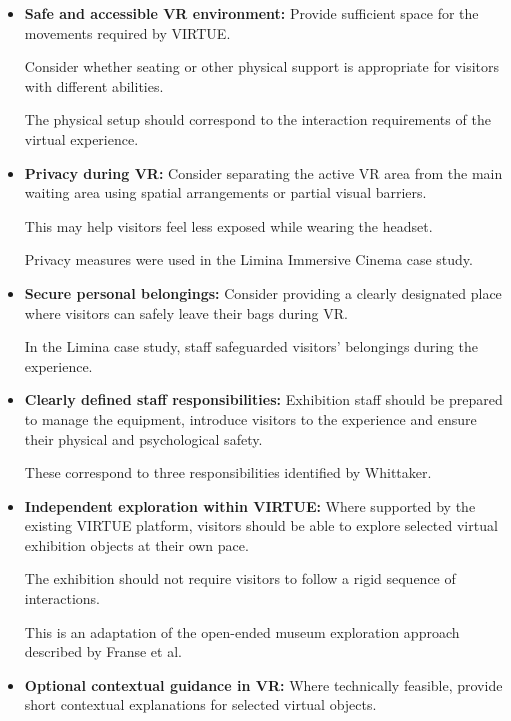 \begin{itemize}
    \item \textbf{Safe and accessible VR environment:}
    Provide sufficient space for the movements required
    by VIRTUE.

    Consider whether seating or other physical support
    is appropriate for visitors with different abilities.

    The physical setup should correspond to the
    interaction requirements of the virtual experience.
    \cite[pp.~100--101]{whittaker_onboarding_2025}

    \item \textbf{Privacy during VR:}
    Consider separating the active VR area from the
    main waiting area using spatial arrangements or
    partial visual barriers.

    This may help visitors feel less exposed while
    wearing the headset.

    Privacy measures were used in the Limina Immersive
    Cinema case study.
    \cite[p.~90]{whittaker_onboarding_2025}

    \item \textbf{Secure personal belongings:}
    Consider providing a clearly designated place where
    visitors can safely leave their bags during VR.

    In the Limina case study, staff safeguarded visitors'
    belongings during the experience.
    \cite[p.~90]{whittaker_onboarding_2025}

    \item \textbf{Clearly defined staff responsibilities:}
    Exhibition staff should be prepared to manage
    the equipment, introduce visitors to the experience
    and ensure their physical and psychological safety.

    These correspond to three responsibilities identified
    by Whittaker.
    \cite[pp.~101--102]{whittaker_onboarding_2025}

    \item \textbf{Independent exploration within VIRTUE:}
    Where supported by the existing VIRTUE platform,
    visitors should be able to explore selected virtual
    exhibition objects at their own pace.

    The exhibition should not require visitors to
    follow a rigid sequence of interactions.

    This is an adaptation of the open-ended museum
    exploration approach described by Franse et al.
    \cite[pp.~708,~733]{franse_families_2021}

    \item \textbf{Optional contextual guidance in VR:}
    Where technically feasible, provide short contextual
    explanations for selected virtual objects.


\end{itemize}
